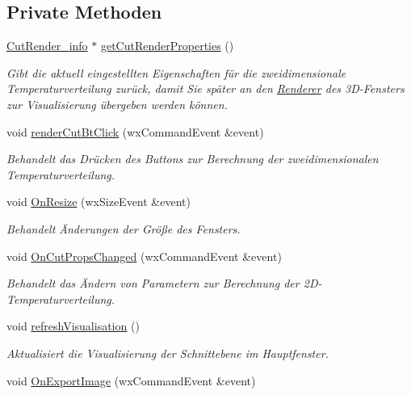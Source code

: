 \subsection*{Private Methoden}
\begin{DoxyCompactItemize}
\item 
\hyperlink{structUtils_1_1CutRender__info}{Cut\-Render\-\_\-info} $\ast$ \hyperlink{classGUICutRenderWindow_a01c347a6ff7868df925e46e48fc1a289}{get\-Cut\-Render\-Properties} ()
\begin{DoxyCompactList}\small\item\em Gibt die aktuell eingestellten Eigenschaften für die zweidimensionale Temperaturverteilung zurück, damit Sie später an den \hyperlink{classRenderer}{Renderer} des 3\-D-\/\-Fensters zur Visualisierung übergeben werden können. \end{DoxyCompactList}\item 
void \hyperlink{classGUICutRenderWindow_a7cd1bfbec53756a1cbbe1616b4d46c7a}{render\-Cut\-Bt\-Click} (wx\-Command\-Event \&event)
\begin{DoxyCompactList}\small\item\em Behandelt das Drücken des Buttons zur Berechnung der zweidimensionalen Temperaturverteilung. \end{DoxyCompactList}\item 
void \hyperlink{classGUICutRenderWindow_ab57ff6c0d5e6465bb0f3b5cf0e6d9dc9}{On\-Resize} (wx\-Size\-Event \&event)
\begin{DoxyCompactList}\small\item\em Behandelt Änderungen der Größe des Fensters. \end{DoxyCompactList}\item 
void \hyperlink{classGUICutRenderWindow_a780972413c43b3086e86c28d581d1f70}{On\-Cut\-Props\-Changed} (wx\-Command\-Event \&event)
\begin{DoxyCompactList}\small\item\em Behandelt das Ändern von Parametern zur Berechnung der 2\-D-\/\-Temperaturverteilung. \end{DoxyCompactList}\item 
void \hyperlink{classGUICutRenderWindow_a525891e3dde6ffd445bfed747dcee970}{refresh\-Visualisation} ()
\begin{DoxyCompactList}\small\item\em Aktualisiert die Visualisierung der Schnittebene im Hauptfenster. \end{DoxyCompactList}\item 
void \hyperlink{classGUICutRenderWindow_a97f4602acc61f4b62c4d90ddbb692a25}{On\-Export\-Image} (wx\-Command\-Event \&event)

\end{DoxyCompactItemize}
